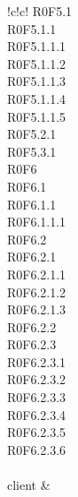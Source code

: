 \begin{tabella}{!{\VRule}c!{\VRule}c!{\VRule}}
{					R0F5.1 \\
					R0F5.1.1 \\
					R0F5.1.1.1 \\
					R0F5.1.1.2 \\
					R0F5.1.1.3 \\
					R0F5.1.1.4 \\
					R0F5.1.1.5 \\
					R0F5.2.1 \\
					R0F5.3.1 \\
					R0F6 \\
					R0F6.1 \\
					R0F6.1.1 \\
					R0F6.1.1.1 \\
					R0F6.2 \\
					R0F6.2.1 \\
					R0F6.2.1.1 \\ 
					R0F6.2.1.2 \\
					R0F6.2.1.3 \\ 
					R0F6.2.2 \\
					R0F6.2.3 \\
					R0F6.2.3.1 \\
					R0F6.2.3.2 \\
					R0F6.2.3.3 \\
					R0F6.2.3.4 \\
					R0F6.2.3.5 \\ 
					R0F6.2.3.6 \\
				} \\
				
	client & \cellacaporiga{
		
}
\end{tabella}
